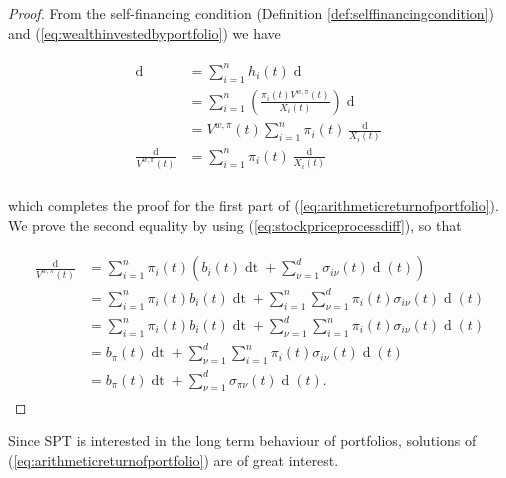\documentclass[british]{amsart} \usepackage{lmodern}
\numberwithin{equation}{section} \numberwithin{figure}{section}
\theoremstyle{plain} \newtheorem{thm}{\protect\theoremname}[section]
\theoremstyle{definition} \newtheorem{defn}[thm]{\protect\definitionname}
\theoremstyle{plain} \newtheorem{assumption}[thm]{\protect\assumptionname}
\theoremstyle{plain} \newtheorem{lem}[thm]{\protect\lemmaname}
\theoremstyle{plain} \newtheorem{prop}[thm]{\protect\propositionname}
\theoremstyle{remark} \newtheorem{rem}[thm]{\protect\remarkname}
\theoremstyle{plain} \newtheorem{cor}[thm]{\protect\corollaryname}
\renewcommand{\d}[1]{\mathop{\mathrm{d}{#1}}}
\begin{document}
\begin{proof}

  From the self-financing condition (Definition \ref{def:selffinancingcondition}) 
  and (\ref{eq:wealthinvestedbyportfolio}) we have

  \begin{gather*}
    \begin{split}
      \d{V^{w,\pi}(t)} 
      &= \sum_{i=1}^{n} h_{i}(t) \d{X_{i}(t)} \\
      &= \sum_{i=1}^{n} \left(  \frac{\pi_{i}(t)V^{w,\pi}(t)}{X_{i}(t)} \right) \d{X_{i}(t)} \\
      &= V^{w,\pi}(t) \sum_{i=1}^{n} \pi_{i}(t) \frac{\d{X_{i}(t)}}{X_{i}(t)} \\
      \frac{\d{V^{w,\pi}(t)}}{V^{w,\pi}(t)} 
      &= \sum_{i=1}^{n} \pi_{i}(t) \frac{\d{X_{i}(t)}}{X_{i}(t)} \\
    \end{split}
  \end{gather*}

   which completes the proof for the first part of (\ref{eq:arithmeticreturnofportfolio}). 
  We prove the second equality by using (\ref{eq:stockpriceprocessdiff}), so that
  
  \begin{gather*}
    \begin{split}
      \frac{\d{V^{w,\pi}(t)}}{V^{w,\pi}(t)}
          & = \sum_{i=1}^{n} \pi_{i}(t) 
          \left(
            b_{i}(t)\d{t} + \sum_{\nu=1}^{d} \sigma_{i\nu}(t) \d{W_{\nu}}(t)
          \right) \\
          & = \sum_{i=1}^{n} \pi_{i}(t) b_{i}(t)\d{t} + 
              \sum_{i=1}^{n} \sum_{\nu=1}^{d} \pi_{i}(t) \sigma_{i\nu}(t) \d{W_{\nu}}(t) \\
          & = \sum_{i=1}^{n} \pi_{i}(t) b_{i}(t)\d{t} + 
              \sum_{\nu=1}^{d} \sum_{i=1}^{n} \pi_{i}(t) \sigma_{i\nu}(t) \d{W_{\nu}}(t) \\
          & = b_{\pi}(t)\d{t} + 
              \sum_{\nu=1}^{d} \sum_{i=1}^{n} \pi_{i}(t) \sigma_{i\nu}(t) \d{W_{\nu}}(t) \\
          & = b_{\pi}(t)\d{t} + 
              \sum_{\nu=1}^{d} \sigma_{\pi\nu}(t) \d{W_{\nu}}(t).
    \end{split}
  \end{gather*}

\end{proof}

Since SPT is interested in the long term behaviour of portfolios, solutions of
(\ref{eq:arithmeticreturnofportfolio}) are of great interest. 
\end{document}
